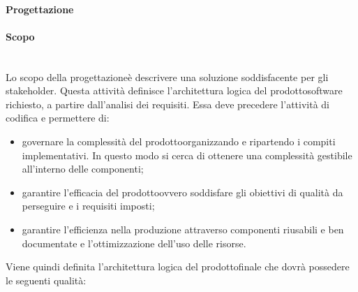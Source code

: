 		\paragraph{Progettazione}
			\paragraph*{Scopo}\mbox{}\\ [1mm]
			Lo scopo della progettazione\glosp è descrivere una soluzione soddisfacente per gli stakeholder\glo. Questa attività definisce l'architettura logica del prodotto\glosp software richiesto, a partire dall'analisi dei requisiti. 
			Essa deve precedere l'attività di codifica e permettere di: 
			\begin{itemize}
				\item governare la complessità del prodotto\glosp organizzando e ripartendo i compiti implementativi. In questo modo si cerca di ottenere una complessità gestibile all'interno delle componenti;
				\item garantire l'efficacia del prodotto\glosp ovvero soddisfare gli obiettivi di qualità da perseguire e i requisiti imposti;
				\item garantire l'efficienza nella produzione attraverso componenti riusabili e ben documentate e l'ottimizzazione dell'uso delle risorse.
			\end{itemize}
			Viene quindi definita l'architettura logica del prodotto\glosp finale che dovrà possedere le seguenti qualità:
